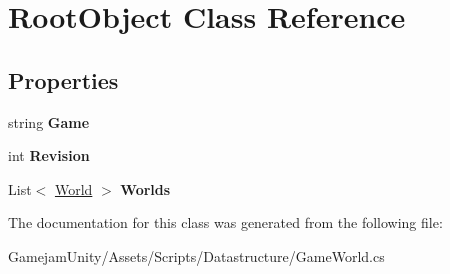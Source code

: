 \hypertarget{class_root_object}{}\section{Root\+Object Class Reference}
\label{class_root_object}
\subsection*{Properties}
\begin{DoxyCompactItemize}
\item 
\mbox{\label{class_root_object_a46d9b6aec7770437b6bbbda31bb29bb4}} 
string {\bfseries Game}
\item 
\mbox{\label{class_root_object_ab04987285f5e56f095eb350a8a3959b5}} 
int {\bfseries Revision}
\item 
\mbox{\label{class_root_object_af5c6c021486a3b6f75cc2f7e6e9b6745}} 
List$<$ \mbox{\hyperlink{class_world}{World}} $>$ {\bfseries Worlds}
\end{DoxyCompactItemize}


The documentation for this class was generated from the following file\+:\begin{DoxyCompactItemize}
\item 
Gamejam\+Unity/\+Assets/\+Scripts/\+Datastructure/Game\+World.\+cs\end{DoxyCompactItemize}
